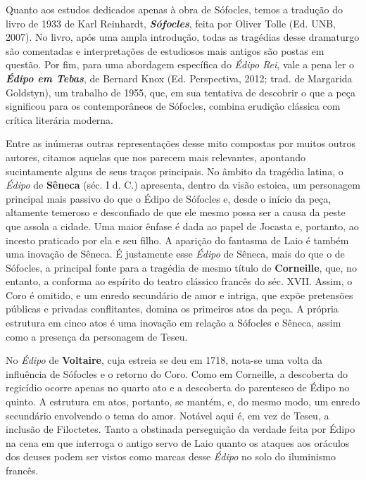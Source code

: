 Quanto aos estudos dedicados apenas à obra de Sófocles, temos a tradução
do livro de 1933 de Karl Reinhardt, \emph{\textbf{Sófocles}}, feita por
Oliver Tolle (Ed. UNB, 2007). No livro, após uma ampla introdução, todas
as tragédias desse dramaturgo são comentadas e interpretações de
estudiosos mais antigos são postas em questão. Por fim, para uma
abordagem específica do \emph{Édipo Rei}, vale a pena ler o
\emph{\textbf{Édipo em Tebas}}, de Bernard Knox (Ed. Perspectiva, 2012;
trad. de Margarida Goldstyn), um trabalho de 1955, que, em sua tentativa
de descobrir o que a peça significou para os contemporâneos de Sófocles,
combina erudição clássica com crítica literária moderna.

Entre as inúmeras outras representações desse mito compostas por muitos
outros autores, citamos aquelas que nos parecem mais relevantes,
apontando sucintamente alguns de seus traços principais. No âmbito da
tragédia latina, o \emph{Édipo} de \textbf{Sêneca} (séc. I d. C.)
apresenta, dentro da visão estoica, um personagem principal mais passivo
do que o Édipo de Sófocles e, desde o início da peça, altamente temeroso
e desconfiado de que ele mesmo possa ser a causa da peste que assola a
cidade. Uma maior ênfase é dada ao papel de Jocasta e, portanto, ao
incesto praticado por ela e seu filho. A aparição do fantasma de Laio é
também uma inovação de Sêneca. É justamente esse \emph{Édipo} de Sêneca,
mais do que o de Sófocles, a principal fonte para a tragédia de mesmo
título de \textbf{Corneille}, que, no entanto, a conforma ao espírito do
teatro clássico francês do séc. XVII. Assim, o Coro é omitido, e um
enredo secundário de amor e intriga, que expõe pretensões públicas e
privadas conflitantes, domina os primeiros atos da peça. A própria
estrutura em cinco atos é uma inovação em relação a Sófocles e Sêneca,
assim como a presença da personagem de Teseu.

No \emph{Édipo} de \textbf{Voltaire}, cuja estreia se deu em 1718,
nota-se uma volta da influência de Sófocles e o retorno do Coro. Como em
Corneille, a descoberta do regicídio ocorre apenas no quarto ato e a
descoberta do parentesco de Édipo no quinto. A estrutura em atos,
portanto, se mantém, e, do mesmo modo, um enredo secundário envolvendo o
tema do amor. Notável aqui é, em vez de Teseu, a inclusão de Filoctetes.
Tanto a obstinada perseguição da verdade feita por Édipo na cena em que
interroga o antigo servo de Laio quanto os ataques aos oráculos dos
deuses podem ser vistos como marcas desse \emph{Édipo} no solo do
iluminismo francês.

